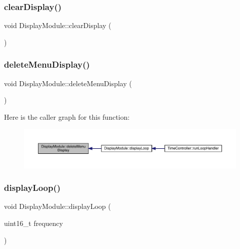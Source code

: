\subsubsection{\texorpdfstring{clear\+Display()}{clearDisplay()}}
{\footnotesize\ttfamily void Display\+Module\+::clear\+Display (\begin{DoxyParamCaption}{ }\end{DoxyParamCaption})}

\mbox{\label{class_display_module_a87e0b873a0f1fcec1bc67f2fa7c9739a}} 
\subsubsection{\texorpdfstring{delete\+Menu\+Display()}{deleteMenuDisplay()}}
{\footnotesize\ttfamily void Display\+Module\+::delete\+Menu\+Display (\begin{DoxyParamCaption}{ }\end{DoxyParamCaption})}

Here is the caller graph for this function\+:
\nopagebreak
\begin{figure}[H]
\begin{center}
\leavevmode
\includegraphics[width=350pt]{class_display_module_a87e0b873a0f1fcec1bc67f2fa7c9739a_icgraph}
\end{center}
\end{figure}
\mbox{\label{class_display_module_ab89f4bb8387cd4a0557b23ee14133568}} 
\subsubsection{\texorpdfstring{display\+Loop()}{displayLoop()}}
{\footnotesize\ttfamily void Display\+Module\+::display\+Loop (\begin{DoxyParamCaption}\item[{uint16\+\_\+t}]{frequency }\end{DoxyParamCaption})}

